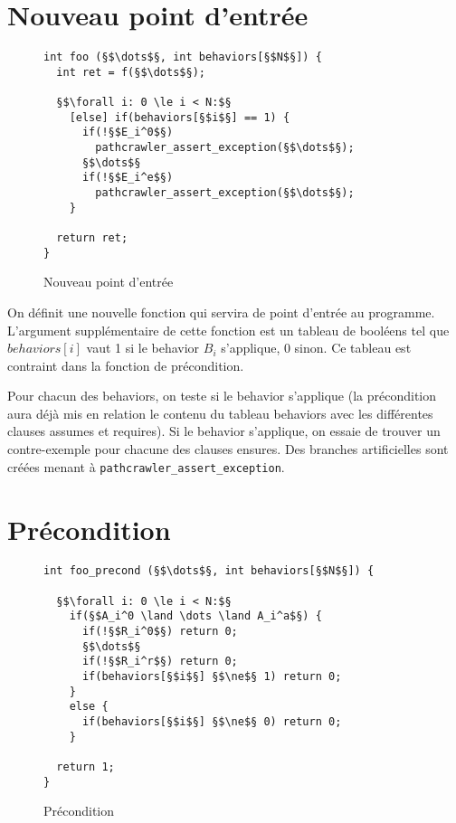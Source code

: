 \section{Nouveau point d'entrée}


\begin{figure}[h]
  \begin{lstlisting}
int foo (§$\dots$§, int behaviors[§$N$§]) {
  int ret = f(§$\dots$§);

  §$\forall i: 0 \le i < N:$§
    [else] if(behaviors[§$i$§] == 1) {
      if(!§$E_i^0$§)
        pathcrawler_assert_exception(§$\dots$§);
      §$\dots$§
      if(!§$E_i^e$§)
        pathcrawler_assert_exception(§$\dots$§);
    }

  return ret;
}
  \end{lstlisting}
  \caption{Nouveau point d'entrée}
\end{figure}

On définit une nouvelle fonction qui servira de point d'entrée au programme.
L'argument supplémentaire de cette fonction est un tableau de booléens tel
que $behaviors[i]$ vaut 1 si le behavior $B_i$ s'applique, 0 sinon. Ce tableau
est contraint dans la fonction de précondition.

Pour chacun des behaviors, on teste si le behavior s'applique (la précondition
aura déjà mis en relation le contenu du tableau behaviors avec les différentes
clauses assumes et requires). Si le behavior s'applique, on essaie de trouver un
contre-exemple pour chacune des clauses ensures. Des branches artificielles sont
créées menant à {\tt pathcrawler\_assert\_exception}.


\section{Précondition}


\begin{figure}[h]
  \begin{lstlisting}
int foo_precond (§$\dots$§, int behaviors[§$N$§]) {

  §$\forall i: 0 \le i < N:$§
    if(§$A_i^0 \land \dots \land A_i^a$§) {
      if(!§$R_i^0$§) return 0;
      §$\dots$§
      if(!§$R_i^r$§) return 0;
      if(behaviors[§$i$§] §$\ne$§ 1) return 0;
    }
    else {
      if(behaviors[§$i$§] §$\ne$§ 0) return 0;
    }

  return 1;
}
  \end{lstlisting}
  \caption{Précondition}
\end{figure}


